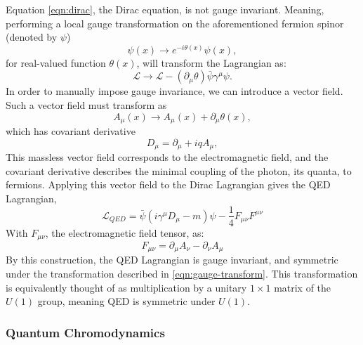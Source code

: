         Equation \ref{eqn:dirac}, the Dirac equation, is not gauge invariant. Meaning, performing a local gauge transformation on the aforementioned fermion spinor (denoted by $\psi$)
        \begin{equation} \label{eqn:gauge-transform}
            \psi(x) \rightarrow e^{-i\theta(x)}\psi(x),
        \end{equation}        
        for real-valued function $\theta(x)$, will transform the Lagrangian as:
        \begin{equation}
            \mathcal{L} \rightarrow \mathcal{L} - (\partial_{\mu}\theta)\bar{\psi}\gamma^{\mu}\psi.
        \end{equation}
        In order to manually impose gauge invariance, we can introduce a vector field. Such a vector field must transform as
        \begin{equation}
            A_{\mu}(x) \rightarrow A_{\mu}(x) + \partial_{\mu}\theta(x),
        \end{equation}
        which has covariant derivative
        \begin{equation}
            D_{\mu} = \partial_{\mu} + iqA_{\mu},
        \end{equation}
        This massless vector field corresponds to the electromagnetic field, and the covariant derivative describes the minimal coupling of the photon, its quanta, to fermions. Applying this vector field to the Dirac Lagrangian gives the \gls{QED} Lagrangian,
        \begin{equation}
            \mathcal{L}_{QED} = \bar{\psi} (i \gamma^{\mu} D_{\mu} - m)\psi - \frac{1}{4} F_{\mu \nu}F^{\mu \nu}
        \end{equation}
        With $F_{\mu \nu}$, the electromagnetic field tensor, as:
        \begin{equation}
        F_{\mu \nu} = \partial_{\mu}A_{\nu} - \partial_{\nu}A_{\mu}
        \end{equation}
        By this construction, the \gls{QED} Lagrangian is gauge invariant, and symmetric under the transformation described in \ref{eqn:gauge-transform}. This transformation is equivalently thought of as multiplication by a unitary $1 \times 1$ matrix of the $U(1)$ group, meaning \gls{QED} is symmetric under $U(1)$.


        \subsubsection{Quantum Chromodynamics} \label{sssec:QCD}


